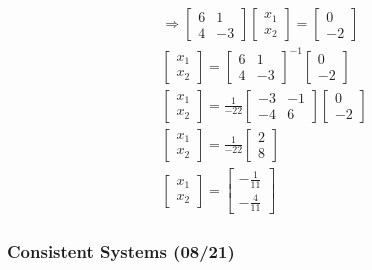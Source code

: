 \documentclass[
  letterpaper,
  DIV=11,
  numbers=noendperiod]{scrartcl}
\begin{document}
\begin{align*}
&\Rightarrow \begin{bmatrix}6 & 1 \\ 4 & -3\end{bmatrix}\begin{bmatrix}x_1 \\ x_2\end{bmatrix}=\begin{bmatrix}0 \\ -2\end{bmatrix} \\
&\begin{bmatrix}x_1 \\ x_2\end{bmatrix}=\begin{bmatrix}6 & 1 \\ 4 & -3\end{bmatrix}^{-1}\begin{bmatrix}0 \\ -2\end{bmatrix} \\
&\begin{bmatrix}x_1 \\ x_2\end{bmatrix}=\frac{1}{-22}\begin{bmatrix}-3 & -1 \\ -4 & 6\end{bmatrix}\begin{bmatrix}0 \\ -2\end{bmatrix} \\
&\begin{bmatrix}x_1 \\ x_2\end{bmatrix}=\frac{1}{-22}\begin{bmatrix}2 \\ 8\end{bmatrix} \\
&\begin{bmatrix}x_1 \\ x_2\end{bmatrix}=\begin{bmatrix}-\frac{1}{11} \\ -\frac{4}{11}\end{bmatrix}
\end{align*}

\newpage{}

\subsubsection{Consistent Systems
(08/21)}\label{consistent-systems-0821}
\end{document}
